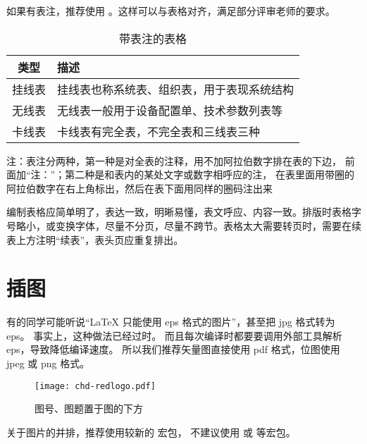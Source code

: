 如果有表注，推荐使用 。这样可以与表格对齐，满足部分评审老师的要求。

\begin{table}
  \centering
  \begin{threeparttable}
    \caption{带表注的表格}
    \label{tab:tablewithnotes}
    \begin{tabular}{cl}
      \toprule[1.5pt]
      类型   & 描述                                       \\
      \midrule[1pt]
      挂线表 & 挂线表也称系统表、组织表，用于表现系统结构 \\
      无线表 & 无线表一般用于设备配置单、技术参数列表等   \\
      卡线表 & 卡线表有完全表，不完全表和三线表三种       \\
      \bottomrule[1.5pt]
    \end{tabular}
    \begin{tablenotes}[flushleft]
      \item 注：表注分两种，第一种是对全表的注释，用不加阿拉伯数字排在表的下边，
      前面加“注：”；第二种是和表内的某处文字或数字相呼应的注，
      在表里面用带圈的阿拉伯数字在右上角标出，然后在表下面用同样的圈码注出来
    \end{tablenotes}
  \end{threeparttable}
\end{table}

编制表格应简单明了，表达一致，明晰易懂，表文呼应、内容一致。排版时表格字号略小，或变换字体，尽量不分页，尽量不跨节。表格太大需要转页时，需要在续表上方注明“续表”，表头页应重复排出。

\section{插图}

有的同学可能听说“\LaTeX{} 只能使用 eps 格式的图片”，甚至把 jpg 格式转为 eps。
事实上，这种做法已经过时。
而且每次编译时都要要调用外部工具解析 eps，导致降低编译速度。
所以我们推荐矢量图直接使用 pdf 格式，位图使用 jpeg 或 png 格式。

\begin{figure}[ht]
  \centering
  \texttt{[image: chd-redlogo.pdf]}
  \caption{图号、图题置于图的下方}
  \label{fig:badge}
\end{figure}

关于图片的并排，推荐使用较新的  宏包，
不建议使用  或  等宏包。

